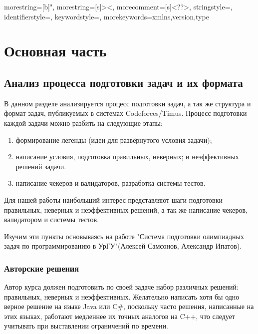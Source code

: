 


{
  morestring=[b]",
  morestring=[s]{>}{<},
  morecomment=[s]{<?}{?>},
  stringstyle=\color{black},
  identifierstyle=\color{darkblue},
  keywordstyle=\color{cyan},
  morekeywords={xmlns,version,type}%
}

\chapter*{Основная часть}
\renewcommand{\thesection}{\arabic{section}}

\section{Анализ процесса подготовки задач и их формата}
\label{cha:analysis}
%
%
В данном разделе анализируется процесс подготовки задач, а так же структура и формат задач, публикуемых в системах Codeforces/Timus.
\newline
Процесс подготовки каждой задачи можно разбить на следующие этапы:
\begin{enumerate}
    \item формирование легенды (идеи для развёрнутого условия задачи);
    \item написание условия, подготовка правильных, неверных;
    и неэффективных решений задачи.
    \item написание чекеров и валидаторов, разработка системы тестов.
\end{enumerate}

Для нашей работы наибольший интерес представляют шаги подготовки правильных, неверных и неэффективных решений, а так же написание чекеров, валидатором и системы тестов. 

Изучим эти пункты основываясь на работе "Система   подготовки   олимпиадных   задач   по   про­граммированию  в  УрГУ"(Алексей Самсонов, Александр Ипатов).


\subsection{Авторские решения}
Автор курса должен подготовить по своей задаче набор различных решений: правильных, неверных и неэффективных. Желательно написать хотя бы одно верное решение на языке Java или C\#, поскольку часто решения, написанные на этих языках, работают медленнее их точных аналогов на C++, что следует учитывать при выставлении ограничений по времени.

